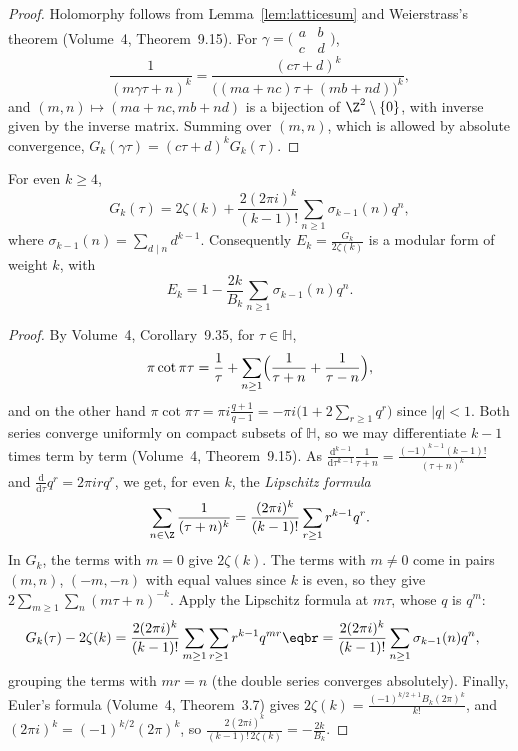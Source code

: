 \begin{proof}
Holomorphy follows from Lemma~\ref{lem:latticesum} and Weierstrass's theorem (Volume~4, Theorem~9.15). For $\gamma=\bigl(\begin{smallmatrix}a&b\\c&d\end{smallmatrix}\bigr)$,
\[
\frac1{(m\gamma\tau+n)^k}=\frac{(c\tau+d)^k}{\bigl((ma+nc)\tau+(mb+nd)\bigr)^k},
\]
and $(m,n)\mapsto(ma+nc,mb+nd)$ is a bijection of $\Z^2\setminus\{0\}$, with inverse given by the inverse matrix. Summing over $(m,n)$, which is allowed by absolute convergence, $G_k(\gamma\tau)=(c\tau+d)^kG_k(\tau)$.
\end{proof}

\begin{theorem}\label{thm:eisensteinq}
For even $k\ge4$,
\[
G_k(\tau)=2\zeta(k)+\frac{2(2\pi i)^k}{(k-1)!}\sum_{n\ge1}\sigma_{k-1}(n)q^n,
\]
where $\sigma_{k-1}(n)=\sum_{d\mid n}d^{k-1}$. Consequently $E_k=\frac{G_k}{2\zeta(k)}$ is a modular form of weight $k$, with
\[
E_k=1-\frac{2k}{B_k}\sum_{n\ge1}\sigma_{k-1}(n)q^n.
\]
\end{theorem}

\begin{proof}
By Volume~4, Corollary~9.35, for $\tau\in\mathbb H$,
\[
\pi\cot\pi\tau=\frac1\tau+\sum_{n\ge1}\Bigl(\frac1{\tau+n}+\frac1{\tau-n}\Bigr),
\]
and on the other hand $\pi\cot\pi\tau=\pi i\frac{q+1}{q-1}=-\pi i\bigl(1+2\sum_{r\ge1}q^r\bigr)$ since $|q|<1$. Both series converge uniformly on compact subsets of $\mathbb H$, so we may differentiate $k-1$ times term by term
(Volume~4, Theorem~9.15). As $\frac{\mathrm d^{k-1}}{\mathrm d\tau^{k-1}}\frac1{\tau+n}=\frac{(-1)^{k-1}(k-1)!}{(\tau+n)^k}$ and $\frac{\mathrm d}{\mathrm d\tau}q^r=2\pi irq^r$, we get, for even $k$, the \emph{Lipschitz formula}
\[
\sum_{n\in\Z}\frac1{(\tau+n)^k}=\frac{(2\pi i)^k}{(k-1)!}\sum_{r\ge1}r^{k-1}q^r.
\]
In $G_k$, the terms with $m=0$ give $2\zeta(k)$. The terms with $m\ne0$ come in pairs $(m,n)$, $(-m,-n)$ with equal values since $k$ is even, so they give $2\sum_{m\ge1}\sum_n(m\tau+n)^{-k}$. Apply the Lipschitz formula
at $m\tau$, whose $q$ is $q^m$:
\[
\begin{aligned}G_k(\tau)-2\zeta(k)&=\frac{2(2\pi i)^k}{(k-1)!}\sum_{m\ge1}\sum_{r\ge1}r^{k-1}q^{mr}\eqbr=\frac{2(2\pi i)^k}{(k-1)!}\sum_{n\ge1}\sigma_{k-1}(n)q^n,\end{aligned}
\]
grouping the terms with $mr=n$ (the double series converges absolutely). Finally, Euler's formula (Volume~4, Theorem~3.7) gives $2\zeta(k)=\frac{(-1)^{k/2+1}B_k(2\pi)^k}{k!}$, and $(2\pi i)^k=(-1)^{k/2}(2\pi)^k$, so
$\frac{2(2\pi i)^k}{(k-1)!\,2\zeta(k)}=-\frac{2k}{B_k}$.
\end{proof}

